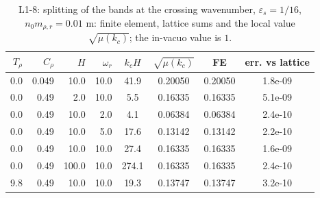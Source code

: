 \begin{table}[htbp]
\centering
\caption{L1-8: splitting of the bands at the crossing wavenumber, $\varepsilon_s = 1/16$, $n_0m_{\rho,r} = 0.01$ m: finite element, lattice sums and the local value $\sqrt{\mu(k_c)}$; the in-vacuo value is $1$.}
\label{tab:L1-8}
\begin{tabular}{rrrrcccc}
\toprule
$T_\rho$ & $C_\rho$ & $H$ & $\omega_r$ & $k_cH$ & $\sqrt{\mu(k_c)}$ & FE & err. vs lattice \\
\midrule
0.0 & 0.049 & 10.0 & 10.0 & 41.9 & 0.20050 & 0.20050 & 1.8e-09 \\
0.0 & 0.49 & 2.0 & 10.0 & 5.5 & 0.16335 & 0.16335 & 5.1e-09 \\
0.0 & 0.49 & 10.0 & 2.0 & 4.1 & 0.06384 & 0.06384 & 2.4e-10 \\
0.0 & 0.49 & 10.0 & 5.0 & 17.6 & 0.13142 & 0.13142 & 2.2e-10 \\
0.0 & 0.49 & 10.0 & 10.0 & 27.4 & 0.16335 & 0.16335 & 1.6e-09 \\
0.0 & 0.49 & 100.0 & 10.0 & 274.1 & 0.16335 & 0.16335 & 2.4e-10 \\
9.8 & 0.49 & 10.0 & 10.0 & 19.3 & 0.13747 & 0.13747 & 3.2e-10 \\
\bottomrule
\end{tabular}
\end{table}
